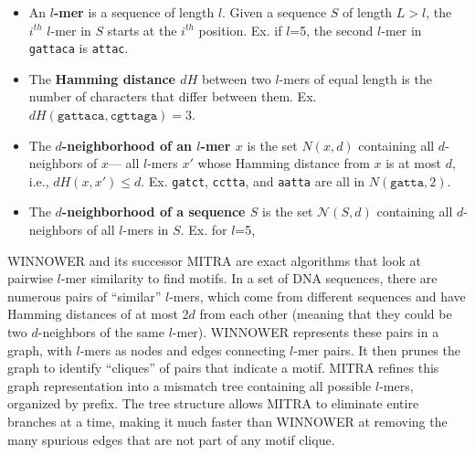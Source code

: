 \documentclass[conference]{IEEEtran}
\begin{document}
	\begin{itemize}
		\item An \textbf{\boldmath $l$-mer} is a sequence of length $l$.
		Given a sequence $S$ of length $L > l$, the $i^{th}$ $l$-mer in $S$ starts at the $i^{th}$ position.
		Ex. if $l$=5, the second $l$-mer in \texttt{gattaca} is \texttt{attac}.

		\item The \textbf{\boldmath Hamming distance $dH$} 
		between two $l$-mers of equal length is the number of characters that differ between them.
		Ex. $dH(\texttt{gattaca}, \texttt{cgttaga}) = 3$.

		\item The \textbf{\boldmath $d$-neighborhood of an $l$-mer $x$}
		is the set {\boldmath $N(x, d)$} containing all $d$-neighbors of $x$---
		all $l$-mers $x'$ whose Hamming distance from $x$ is at most $d$, i.e., {\boldmath $dH (x, x') \leq d$}.
		\newline Ex. \texttt{gatct}, \texttt{cctta}, and \texttt{aatta} are all in $N(\texttt{gatta}, 2)$.

		\item The \textbf{\boldmath $d$-neighborhood of a sequence $S$} %
		is the set {\boldmath $\mathcal{N}(S, d)$}
		\newline containing all $d$-neighbors of all $l$-mers in $S$. Ex. for $l$=5,
		
		\end{itemize}

	WINNOWER \cite{pevzner2000combinatorial} and its successor MITRA \cite{eskin2002finding} are exact algorithms that look at pairwise $l$-mer similarity to find motifs. In a set of DNA sequences, there are numerous pairs of ``similar'' $l$-mers, which come from different sequences and have Hamming distances of at most 2$d$ from each other (meaning that they could be two $d$-neighbors of the same $l$-mer). WINNOWER represents these pairs in a graph, with $l$-mers as nodes and edges connecting $l$-mer pairs. It then prunes the graph to identify ``cliques'' of pairs that indicate a motif. MITRA refines this graph representation into a mismatch tree containing all possible $l$-mers, organized by prefix. The tree structure allows MITRA to eliminate entire branches at a time, making it much faster than WINNOWER at removing the many spurious edges that are not part of any motif clique.
\end{document}
